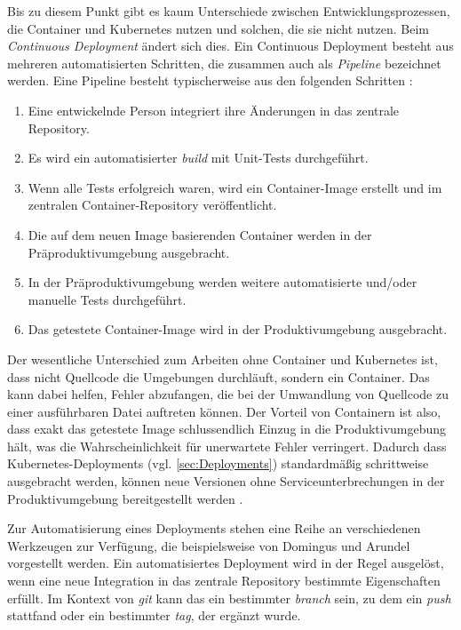 \documentclass[11pt,a4paper]{article}
\begin{document}
Bis zu diesem Punkt gibt es kaum Unterschiede zwischen Entwicklungsprozessen,
die Container und Kubernetes nutzen und solchen, die sie nicht nutzen.
Beim \emph{Continuous Deployment} ändert sich dies.
Ein Continuous Deployment besteht aus mehreren automatisierten Schritten,
die zusammen auch als \emph{Pipeline} bezeichnet werden.
Eine Pipeline besteht typischerweise aus den folgenden Schritten \cite{domingus2022cloud}:
\begin{enumerate}
  \item Eine entwickelnde Person integriert ihre Änderungen in das zentrale Repository.
  \item Es wird ein automatisierter \emph{build} mit Unit-Tests durchgeführt.
  \item Wenn alle Tests erfolgreich waren, wird ein Container-Image erstellt und im zentralen Container-Repository veröffentlicht.
  \item Die auf dem neuen Image basierenden Container werden in der Präproduktivumgebung ausgebracht.
  \item In der Präproduktivumgebung werden weitere automatisierte und/oder manuelle Tests durchgeführt.
  \item Das getestete Container-Image wird in der Produktivumgebung ausgebracht.
\end{enumerate}
Der wesentliche Unterschied zum Arbeiten ohne Container und Kubernetes ist, dass nicht Quellcode
die Umgebungen durchläuft, sondern ein Container. Das kann dabei helfen, Fehler abzufangen,
die bei der Umwandlung von Quellcode zu einer ausführbaren Datei auftreten können.
Der Vorteil von Containern ist also, dass exakt das getestete Image schlussendlich
Einzug in die Produktivumgebung hält, was die Wahrscheinlichkeit für unerwartete Fehler verringert.
Dadurch dass Kubernetes-Deployments (vgl. \ref{sec:Deployments}) standardmäßig schrittweise ausgebracht werden,
können neue Versionen ohne Serviceunterbrechungen in der Produktivumgebung bereitgestellt werden \cite{domingus2022cloud}.

Zur Automatisierung eines Deployments stehen eine Reihe an verschiedenen Werkzeugen
zur Verfügung, die beispielsweise von Domingus und Arundel \cite{domingus2022cloud}
vorgestellt werden. Ein automatisiertes Deployment wird in der Regel ausgelöst,
wenn eine neue Integration in das zentrale Repository bestimmte Eigenschaften erfüllt.
Im Kontext von \emph{git} kann das ein bestimmter \emph{branch} sein, zu dem
ein \emph{push} stattfand oder ein bestimmter \emph{tag}, der ergänzt wurde.
\end{document}
